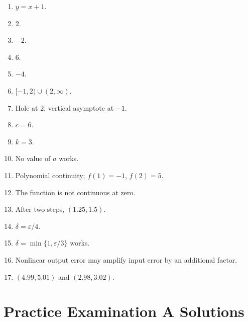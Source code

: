 \documentclass[11pt,openany]{book}
\theoremstyle{bgplain}
\newcommand{\eps}{\varepsilon}
\begin{document}
\begin{enumerate}[label=\textbf{R\arabic*.}]
  \item \(y=x+1\).
  \item \(2\).
  \item \(-2\).
  \item \(6\).
  \item \(-4\).
  \item \([-1,2)\cup(2,\infty)\).
  \item Hole at \(2\); vertical asymptote at \(-1\).
  \item \(c=6\).
  \item \(k=3\).
  \item No value of \(a\) works.
  \item Polynomial continuity; \(f(1)=-1\), \(f(2)=5\).
  \item The function is not continuous at zero.
  \item After two steps, \((1.25,1.5)\).
  \item \(\delta=\eps/4\).
  \item \(\delta=\min\{1,\eps/3\}\) works.
  \item Nonlinear output error may amplify input error by an additional factor.
  \item \((4.99,5.01)\) and \((2.98,3.02)\).
\end{enumerate}

\section{Practice Examination A Solutions}
\end{document}

